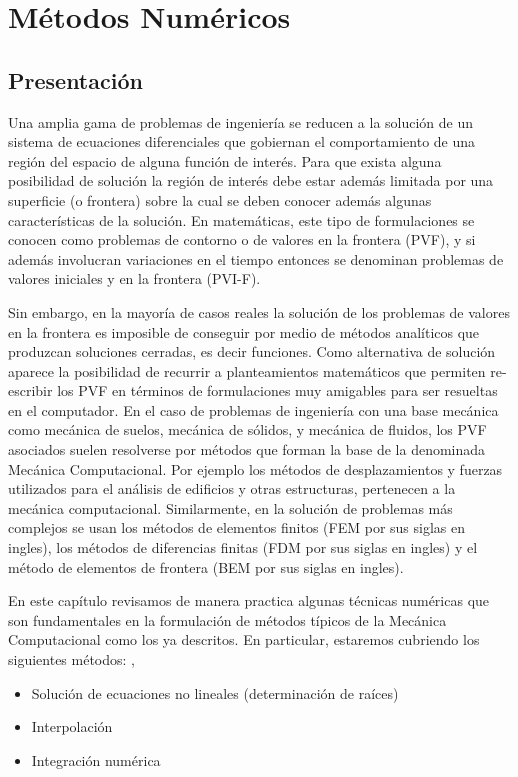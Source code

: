 \graphicspath{{img/metodos/}}
\chapter{Métodos Numéricos}

\section*{Presentación}

Una amplia gama de problemas de ingeniería se reducen a la solución de un 
sistema de ecuaciones diferenciales que gobiernan el comportamiento
de una región del espacio de alguna función de interés. Para que exista alguna 
posibilidad de solución la región de interés debe estar además limitada por una 
superficie (o frontera) sobre la cual se deben conocer además algunas 
características de la solución. En matemáticas, este tipo de formulaciones se 
conocen como problemas de contorno o de valores en la frontera (PVF), y si 
además involucran variaciones en el tiempo entonces se denominan problemas de 
valores iniciales y en la frontera (PVI-F).

Sin embargo, en la mayoría de casos reales la solución de los problemas de
valores en la frontera es imposible de conseguir por medio de métodos 
analíticos que produzcan soluciones cerradas, es decir funciones. Como 
alternativa de solución aparece la posibilidad de recurrir a planteamientos 
matemáticos que permiten re-escribir los PVF en términos de formulaciones muy 
amigables para ser resueltas en el computador. En el caso de problemas de 
ingeniería con una base mecánica como mecánica de suelos, mecánica de sólidos, 
y mecánica de fluidos, los PVF asociados suelen resolverse por métodos que 
forman la base de la denominada Mecánica Computacional. Por ejemplo los métodos 
de desplazamientos y fuerzas utilizados para el análisis de edificios y otras 
estructuras, pertenecen a la mecánica computacional. Similarmente, en la 
solución de problemas más complejos se usan los métodos de elementos finitos 
(FEM por sus siglas en ingles), los métodos de diferencias finitas (FDM por sus 
siglas en ingles) y el método de elementos de frontera (BEM por sus siglas en 
ingles).

En este capítulo revisamos de manera practica algunas técnicas numéricas que 
son fundamentales en la formulación de métodos típicos de la Mecánica 
Computacional como los ya descritos. En particular, estaremos cubriendo los 
siguientes métodos:
,\begin{itemize}
\item Solución de ecuaciones no lineales (determinación de raíces)

\item Interpolación

\item Integración numérica
\end{itemize}

